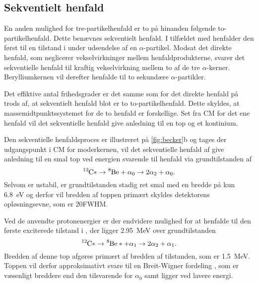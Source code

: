 \subsection{Sekventielt henfald}
\label{sec:sekventielt-henfald}

En anden mulighed for tre-partikelhenfald er to på hinanden følgende to-partikelhenfald. Dette
benævnes sekventielt henfald. I tilfældet med \Carb henfalder den først til en tilstand i \Be under
udsendelse af en $\alpha$-partikel. Modsat det direkte henfald, som neglicerer vekselvirkninger mellem
henfaldprodukterne, svarer det sekventielle henfald til kraftig vekselvirkning mellem to af de tre
$\alpha$-kerner. Berylliumkernen vil derefter henfalde til to sekundære $\alpha$-partikler.

Det effiktive antal frihedsgrader er det samme som for det direkte henfald på trods af, at
sekventielt henfald blot er to to-partikelhenfald. Dette skyldes, at massemidtpunktssystemet for de
to henfald er forskellige. Set fra CM for det ene henfald vil det sekventielle henfald give
anledning til en top og et kontinium.


Den sekventielle henfaldsproces er illustreret på \cref{fig:becker}b og tages der udgangspunkt i CM
for moderkernen, vil det sekventielle henfald af \Carb give anledning til en smal top ved energien
svarende til henfald via grundtilstanden af \Be
\begin{equation}
  \label{eq:alpha0}
  \Carb* \rightarrow \Be + \alpha_{0} \rightarrow 2\alpha_{2} + \alpha_{0}.
\end{equation}
Selvom \Be er ustabil, er grundtilstanden stadig ret smal med en bredde på kun
\SI{6.8}{\eV} \cite{States} og derfor vil bredden af toppen primært skyldes detektorens
opløsningsevne, som er 20\keV FWHM. 

Ved de anvendte protonenergier er der endvidere mulighed for at henfalde til den første exciterede
tilstand i \Be, der ligger \SI{2.95}{\MeV} over grundtilstanden
\begin{equation}
  \label{eq:alpha0}
  \Carb* \rightarrow \Be* + \alpha_{1} \rightarrow 2\alpha_{2} + \alpha_{1}.
\end{equation}
Bredden af denne top afgøres primært af bredden af \Be tilstanden, som er \SI{1.5}{\MeV}. Toppen vil
derfor approksimativt svare til en Breit-Wigner fordeling \cite[s. 26]{Martin}, som er væsenligt
breddere end den tilsvarende for $\alpha_{0}$ samt ligger ved lavere energi.

